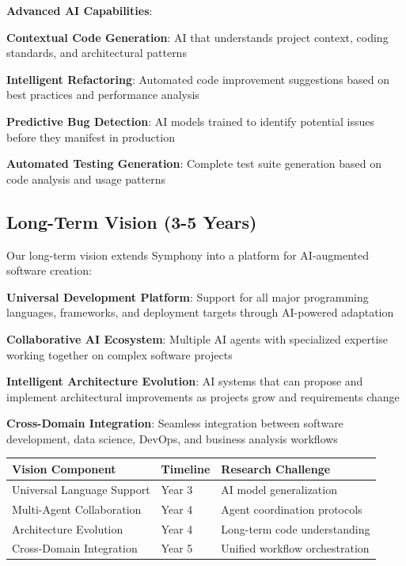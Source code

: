 \textbf{Advanced AI Capabilities}:
\begin{compactlist}
    \item \textbf{Contextual Code Generation}: AI that understands project context, coding standards, and architectural patterns
    \item \textbf{Intelligent Refactoring}: Automated code improvement suggestions based on best practices and performance analysis
    \item \textbf{Predictive Bug Detection}: AI models trained to identify potential issues before they manifest in production
    \item \textbf{Automated Testing Generation}: Complete test suite generation based on code analysis and usage patterns
\end{compactlist}

\subsection*{Long-Term Vision (3-5 Years)}

Our long-term vision extends Symphony into a platform for AI-augmented software creation:

\begin{expandedlist}
    \item \textbf{Universal Development Platform}: Support for all major programming languages, frameworks, and deployment targets through AI-powered adaptation
    \item \textbf{Collaborative AI Ecosystem}: Multiple AI agents with specialized expertise working together on complex software projects
    \item \textbf{Intelligent Architecture Evolution}: AI systems that can propose and implement architectural improvements as projects grow and requirements change
    \item \textbf{Cross-Domain Integration}: Seamless integration between software development, data science, DevOps, and business analysis workflows
\end{expandedlist}

\begin{center}
\begin{tabular}{@{}lll@{}}
\toprule
\textbf{Vision Component} & \textbf{Timeline} & \textbf{Research Challenge} \\
\midrule
Universal Language Support & Year 3 & AI model generalization \\
Multi-Agent Collaboration & Year 4 & Agent coordination protocols \\
Architecture Evolution & Year 4 & Long-term code understanding \\
Cross-Domain Integration & Year 5 & Unified workflow orchestration \\
\bottomrule
\end{tabular}
\end{center}

